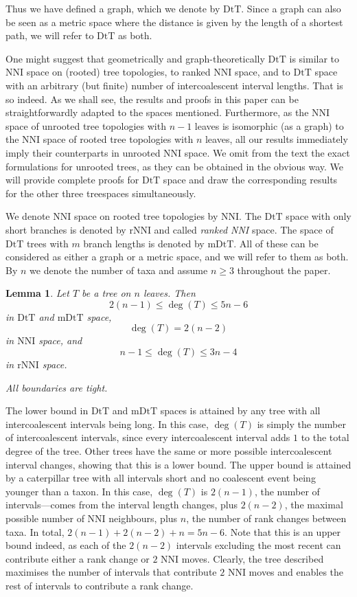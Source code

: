 \documentclass{amsart}
\newtheorem{lemma}{Lemma}
\newcommand{\dts}{\mathrm{DtT}}
\newcommand{\nni}{\mathrm{NNI}}
\newcommand{\rnni}{\mathrm{rNNI}}
\newcommand{\mdts}{\mathrm{mDtT}}
\begin{document}
Thus we have defined a graph, which we denote by $\dts$.
Since a graph can also be seen as a metric space where the distance is given by the length of a shortest path, we will refer to $\dts$ as both.

One might suggest that geometrically and graph-theoretically $\dts$ is similar to NNI space on (rooted) tree topologies, to ranked NNI space, and to $\dts$ space with an arbitrary (but finite) number of intercoalescent interval lengths.
That is so indeed.
As we shall see, the results and proofs in this paper can be straightforwardly adapted to the spaces mentioned.
Furthermore, as the NNI space of unrooted tree topologies with $n-1$ leaves is isomorphic (as a graph) to the NNI space of rooted tree topologies with $n$ leaves, all our results immediately imply their counterparts in unrooted NNI space.
We omit from the text the exact formulations for unrooted trees, as they can be obtained in the obvious way.
We will provide complete proofs for $\dts$ space and draw the corresponding results for the other three treespaces simultaneously.

We denote NNI space on rooted tree topologies by $\nni$.
The $\dts$ space with only short branches is denoted by $\rnni$ and called {\em ranked NNI} space.
The space of $\dts$ trees with $m$ branch lengths is denoted by $\mdts$.
All of these can be considered as either a graph or a metric space, and we will refer to them as both.
By $n$ we denote the number of taxa and assume $n \geq 3$ throughout the paper.

\begin{lemma}\label{neighBound}
Let $T$ be a tree on $n$ leaves.
Then
\[2(n-1) \leq \deg(T) \leq 5n-6\] in $\dts$ and $\mdts$ space,
\[\deg(T) = 2(n-2)\] in $\nni$ space, and
\[n-1\leq \deg(T) \leq3n-4\] in $\rnni$ space.

All boundaries are tight.
\end{lemma}

\proof
The lower bound in $\dts$ and $\mdts$ spaces is attained by any tree with all intercoalescent intervals being long.
In this case, $\deg(T)$ is simply the number of intercoalescent intervals, since every intercoalescent interval adds $1$ to the total degree of the tree.
Other trees have the same or more possible intercoalescent interval changes, showing that this is a lower bound.
The upper bound is attained by a caterpillar tree with all intervals short and no coalescent event being younger than a taxon.
In this case, $\deg(T)$ is $2(n-1)$, the number of intervals---comes from the interval length changes, plus $2(n-2)$, the maximal possible number of NNI neighbours, plus $n$, the number of rank changes between taxa.
In total, $2(n-1) + 2(n-2) + n = 5n-6$.
Note that this is an upper bound indeed, as each of the $2(n-2)$ intervals excluding the most recent can contribute either a rank change or $2$ NNI moves.
Clearly, the tree described maximises the number of intervals that contribute $2$ NNI moves and enables the rest of intervals to contribute a rank change.
\end{document}
